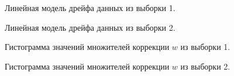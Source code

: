 \begin{figure}[H]
	\caption{Линейная модель дрейфа данных из выборки 1.}
	\label{ris:image1}
\end{figure}

\begin{figure}[H]
	\caption{Линейная модель дрейфа данных из выборки 2.}
	\label{ris:image1}
\end{figure}

\begin{figure}[H]
	\caption{Гистограмма значений множителей коррекции $w$ из выборки 1.}
	\label{ris:hist1}
\end{figure}

\begin{figure}[H]
	\caption{Гистограмма значений множителей коррекции $w$ из выборки 2.}
	\label{ris:hist2}
\end{figure}

